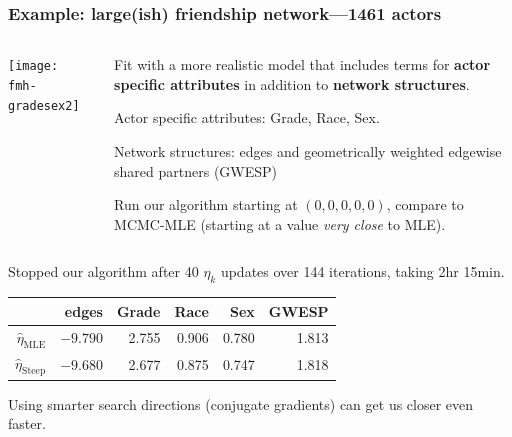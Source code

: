 \documentclass[slidestop,compress, 10pt]{beamer}
\newcommand{\etaMLE}{\hat{\eta}_{\textrm{MLE}}}
\begin{document}
\frame
{
  \frametitle{Example: large(ish) friendship network---1461 actors}  
\begin{columns}[t]
\begin{column}[T]{0.3\textwidth}
\texttt{[image: fmh-gradesex2]}
\end{column}

\begin{column}[T]{0.7\textwidth}
Fit with a more realistic model that includes terms for \textbf{actor 
specific attributes} in addition to \textbf{network structures}.  
\vspace{1mm}

Actor specific attributes: Grade, Race, Sex.
\vspace{2mm}

Network structures: edges and geometrically weighted edgewise shared partners (GWESP)
\vspace{2mm}
\pause

Run our algorithm starting at $(0,0,0,0,0)$, compare to MCMC-MLE (starting at a value \emph{very close} to MLE).
\end{column}
\end{columns}
\vspace{2mm}

\pause
Stopped our algorithm after 40 $\eta_k$ updates over 144 iterations, taking 2hr 15min.
\begin{table}
\begin{center} 

\begin{tabular}{rrrrrr}
  \hline
 & edges & Grade & Race & Sex & GWESP \\ 
  \hline
$\etaMLE$ & $-9.790$ & 2.755 & 0.906 & 0.780 & 1.813 \\ 
$\hat{\eta}_{\textrm{Steep}}$ & 	$-9.680$&	2.677&	0.875&	0.747&	1.818 \\ 
   \hline
\end{tabular}\label{T:FauxMagnolia}
\end{center}
\end{table}

Using smarter search directions (conjugate gradients) can get us closer even
faster.
}
\end{document}
